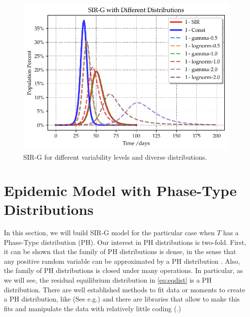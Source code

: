 \documentclass[USenglish,10pt]{article}
\newcommand{\eg}{e.g.\xspace}
\begin{document}
\begin{figure}
	\centering
	\includegraphics[width=.8\linewidth]{Variance-Analysis.pdf}
	\caption{SIR-G for different variability levels and diverse distributions.}
	\label{fig:var}
\end{figure}

\section{Epidemic Model with Phase-Type Distributions}\label{sc:PH}

In this section, we will build SIR-G model for the particular case when $T$ has a Phase-Type distribution (PH)\cite{neut81,lato.rama99}. Our interest in PH distributions is two-fold. First, it can be shown that the family of PH distributions is dense, in the sense that any positive random variable can be approximated by a PH distribution \cite{neut81}.
Also, the family of PH distributions is closed under many operations. In particular, as we will see, the residual equilibrium distribution in \eqref{eq:eqdist} is a PH distribution.
There are well established methods to fit data or moments to create a PH distribution, like (See \eg \cite{bobb.horv.ea03,bobb.horv.ea05,thum.buch.ea05}) and there are libraries that allow to make this fits and manipulate the data with relatively little coding (\cite{Per.ea.17,tele.torv20}.)
\end{document}
